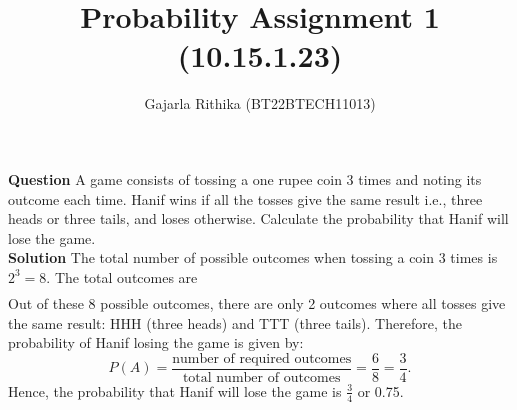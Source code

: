 \documentclass[12pt,twocolumn,notitlepage]{article}
\title{Probability Assignment 1 (10.15.1.23)}
\author{Gajarla Rithika (BT22BTECH11013)}
\date{}
\begin{document}
\maketitle
\textbf{Question}
A game consists of tossing a one rupee coin 3 times and noting its outcome each time. Hanif wins if all the tosses give the same result i.e., three heads or three tails, and loses otherwise. Calculate the probability that Hanif will lose the game.\\

\textbf{Solution}
The total number of possible outcomes when tossing a coin 3 times is $2^3 = 8$. The total outcomes are
\begin{align}
        [
\{ HHH, HHT, HTH, THH, HTT, THT, TTH, TTT \}
]
\end{align}
Out of these 8 possible outcomes, there are only 2 outcomes where all tosses give the same result: HHH (three heads) and TTT (three tails).
Therefore, the probability of Hanif losing the game is given by:
\begin{equation*}
    P(A) = \frac{\text{number of required outcomes}}{\text{total number of outcomes}} = \frac{6}{8} = \frac{3}{4}.
\end{equation*}
Hence, the probability that Hanif will lose the game is $\frac{3}{4}$ or 0.75.
\end{document}

